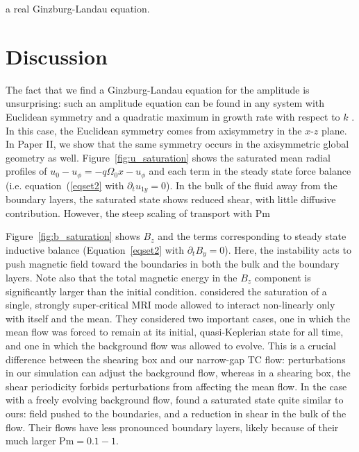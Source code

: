 \documentclass{emulateapj}
\newcommand{\Pm}{\mathrm{Pm}}
\begin{document}
a real Ginzburg-Landau equation. 

\section{Discussion}
\label{sec:discussion}

The fact that we find a Ginzburg-Landau equation for the amplitude is unsurprising: such an amplitude equation can be found in any system with Euclidean symmetry and a quadratic maximum in growth rate with respect to $k$ \citep{Hoyle:2006}. In this case, the Euclidean symmetry comes from axisymmetry in the $x$-$z$ plane.  In Paper II, we show that the same symmetry occurs in the axisymmetric global geometry as well. Figure~\ref{fig:u_saturation} shows the saturated mean radial profiles of $u_0 - u_{\phi} = -q \Omega_0 x - u_{\phi}$ and each term in the steady state force balance (i.e. equation~(\ref{eqset2} with $\partial_t u_{1y} = 0$). In the bulk of the fluid away from the boundary layers, the saturated state shows reduced shear, with little diffusive contribution. However, the steep scaling of transport with $\Pm$

Figure~\ref{fig:b_saturation} shows $B_z$ and the terms corresponding to steady state inductive balance (Equation~\ref{eqset2} with $\partial_t B_{y} = 0$). Here, the instability acts to push magnetic field toward the boundaries in both the bulk and the boundary layers. Note also that the total magnetic energy in the $B_z$ component is significantly larger than the initial condition. \citet{Ebrahimi:2009} considered the saturation of a single, strongly super-critical MRI mode allowed to interact non-linearly only with itself and the mean. They considered two important cases, one in which the mean flow was forced to remain at its initial, quasi-Keplerian state for all time, and one in which the background flow was allowed to evolve. This is a crucial difference between the shearing box and our narrow-gap TC flow: perturbations in our simulation can adjust the background flow, whereas in a shearing box, the shear periodicity forbids perturbations from affecting the mean flow. In the case with a freely evolving background flow, \citet{Ebrahimi:2009ey} found a saturated state quite similar to ours: field pushed to the boundaries, and a reduction in shear in the bulk of the flow. Their flows have less pronounced boundary layers, likely because of their much larger $\Pm = 0.1 -1$. 
\end{document}
